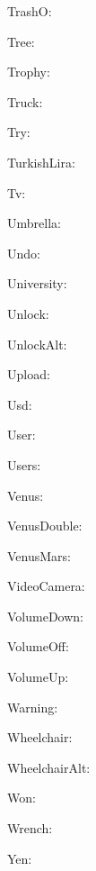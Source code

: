 \documentclass{article}
\begin{document}
      TrashO: \faTrashO\ 

      Tree: \faTree\ 

      Trophy: \faTrophy\ 

      Truck: \faTruck\ 

      Try: \faTry\ 

      TurkishLira: \faTurkishLira\ 

      Tv: \faTv\ 

      Umbrella: \faUmbrella\ 

      Undo: \faUndo\ 

      University: \faUniversity\ 

      Unlock: \faUnlock\ 

      UnlockAlt: \faUnlockAlt\ 

      Upload: \faUpload\ 

      Usd: \faUsd\ 

      User: \faUser\ 

      Users: \faUsers\ 

      Venus: \faVenus\ 

      VenusDouble: \faVenusDouble\ 

      VenusMars: \faVenusMars\ 

      VideoCamera: \faVideoCamera\ 

      VolumeDown: \faVolumeDown\ 

      VolumeOff: \faVolumeOff\ 

      VolumeUp: \faVolumeUp\ 

      Warning: \faWarning\ 

      Wheelchair: \faWheelchair\ 

      WheelchairAlt: \faWheelchairAlt\ 

      Won: \faWon\ 

      Wrench: \faWrench\ 

      Yen: \faYen\ 
\end{document}
